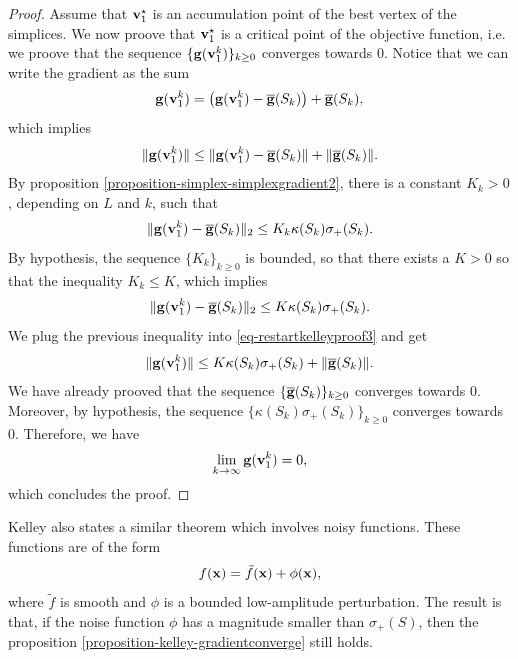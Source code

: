 \begin{proof}
Assume that $\mathbf{v}_1^\star$ is an accumulation point of the best vertex of the simplices.
We now proove that $\mathbf{v}_1^\star$ is a critical point of the objective function, i.e.
we proove that the sequence $\{ \mathbf{g}(\mathbf{v}_1^k) \}_{k\geq 0}$ converges towards 0.
Notice that we can write the gradient as the sum
\begin{eqnarray}
\label{eq-restartkelleyproof2}
\mathbf{g}(\mathbf{v}_1^k) = \left( \mathbf{g}(\mathbf{v}_1^k) - \overline{\mathbf{g}}(S_k) \right) + \overline{\mathbf{g}}(S_k),
\end{eqnarray}
which implies 
\begin{eqnarray}
\label{eq-restartkelleyproof3}
\| \mathbf{g}(\mathbf{v}_1^k) \| \leq \| \mathbf{g}(\mathbf{v}_1^k) - \overline{\mathbf{g}}(S_k) \| + \|\overline{\mathbf{g}}(S_k) \|.
\end{eqnarray}
By proposition \ref{proposition-simplex-simplexgradient2}, there is a constant $K_k>0$,
depending on $L$ and $k$, such that 
\begin{eqnarray}
\| \mathbf{g}(\mathbf{v}_1^k) - \overline{\mathbf{g}}(S_k) \|_2 \leq K_k \kappa(S_k) \sigma_+(S_k).
\end{eqnarray}
By hypothesis, the sequence $\{ K_k \}_{k\geq 0}$ is bounded, so that there exists a $K>0$ so that 
the inequality $K_k\leq K$, which implies 
\begin{eqnarray}
\| \mathbf{g}(\mathbf{v}_1^k) - \overline{\mathbf{g}}(S_k) \|_2 \leq K \kappa(S_k) \sigma_+(S_k).
\end{eqnarray}
We plug the previous inequality into \ref{eq-restartkelleyproof3} and get
\begin{eqnarray}
\label{eq-restartkelleyproof4}
\| \mathbf{g}(\mathbf{v}_1^k) \| \leq K \kappa(S_k) \sigma_+(S_k) + \|\overline{\mathbf{g}}(S_k) \|.
\end{eqnarray}
We have already prooved that the sequence $\{\overline{\mathbf{g}}(S_k)\}_{k\geq 0}$ converges towards 0.
Moreover, by hypothesis, the sequence $\{\kappa(S_k) \sigma_+(S_k)\}_{k\geq 0}$
converges towards 0.
Therefore, we have 
\begin{eqnarray}
\lim_{k \rightarrow \infty} \mathbf{g}(\mathbf{v}_1^k) = 0,
\end{eqnarray}
which concludes the proof.
\end{proof}

Kelley also states a similar theorem which involves noisy functions. 
These functions are of the form 
\begin{eqnarray}
f(\mathbf{x}) = \tilde{f}(\mathbf{x})  + \phi(\mathbf{x}),
\end{eqnarray}
where $\tilde{f}$ is smooth and $\phi$ is a bounded low-amplitude perturbation.
The result is that, if the noise function $\phi$ has a magnitude 
smaller than $\sigma_+(S)$, then the proposition \ref{proposition-kelley-gradientconverge} 
still holds. 

